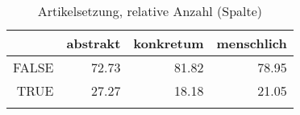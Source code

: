 \begin{table}[ht]
\centering
\begin{tabular}{rrrr}
  \lsptoprule
 & abstrakt & konkretum & menschlich \\ 
  \midrule
FALSE & 72.73 & 81.82 & 78.95 \\ 
  TRUE & 27.27 & 18.18 & 21.05 \\ 
   \lspbottomrule
\end{tabular}
\caption{Artikelsetzung, relative Anzahl (Spalte)} 
\end{table}
